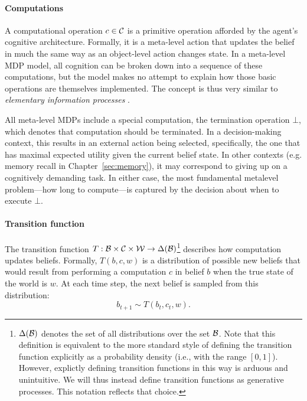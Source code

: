 
\paragraph{Computations}
A computational operation $c \in \mathcal{C}$ is a primitive operation afforded by the agent's cognitive architecture. Formally, it is a meta-level action that updates the belief in much the same way as an object-level action changes state. In a meta-level MDP model, all cognition can be broken down into a sequence of these computations, but the model makes no attempt to explain how those basic operations are themselves implemented. The concept is thus very similar to \emph{elementary information processes} \citep{chase1978elementary,simon1979information,posner1982information,payne1988adaptive}. 

All meta-level MDPs include a special computation, the termination operation $\bot$, which denotes that computation should be terminated. In a decision-making context, this results in an external action being selected, specifically, the one that has maximal expected utility given the current belief state. In other contexts (e.g. memory recall in Chapter~\ref{sec:memory}), it may correspond to giving up on a cognitively demanding task. In either case, the most fundamental metalevel problem---how long to compute---is captured by the decision about when to execute $\bot$.

\paragraph{Transition function}
The transition function $T: \mathcal{B} \times \mathcal{C} \times \mathcal{W} \rightarrow \Delta(\mathcal{B})$\footnote{%
  $\Delta(\mathcal{B})$ denotes the set of all distributions over the set $\mathcal{B}$. Note that this definition is equivalent to the more standard style of defining the transition function explicitly as a probability density (i.e., with the range $[0, 1]$). However, explictly defining transition functions in this way is arduous and unintuitive. We will thus instead define transition functions as generative processes. This notation reflects that choice.
} describes how computation updates beliefs. Formally, $T(b, c, w)$ is a distribution of possible new beliefs that would result from performing a computation $c$ in belief $b$ when the true state of the world is $w$. At each time step, the next belief is sampled from this distribution:
\begin{equation}
b_{t+1} \sim T(b_t, c_t, w).
\end{equation}

